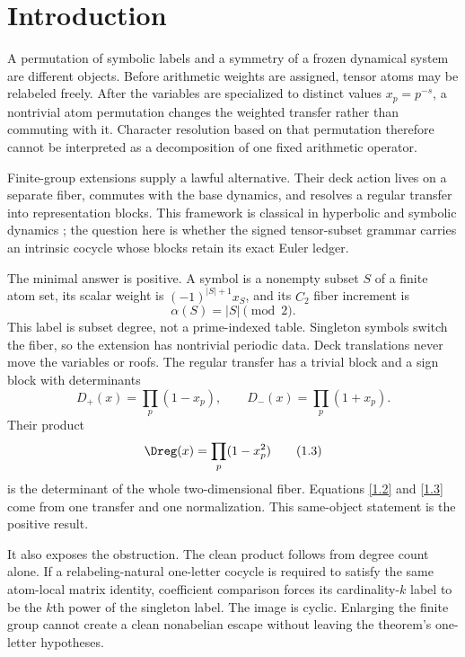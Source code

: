 \section{Introduction}
\label{sec:introduction}

A permutation of symbolic labels and a symmetry of a frozen dynamical system
are different objects.  Before arithmetic weights are assigned, tensor atoms
may be relabeled freely.  After the variables are specialized to distinct
values \(x_p=p^{-s}\), a nontrivial atom permutation changes the weighted
transfer rather than commuting with it.  Character resolution based on that
permutation therefore cannot be interpreted as a decomposition of one fixed
arithmetic operator.

Finite-group extensions supply a lawful alternative.  Their deck action lives
on a separate fiber, commutes with the base dynamics, and resolves a regular
transfer into representation blocks.  This framework is classical in
hyperbolic and symbolic dynamics
\citep{ParryPollicott1986,AdachiSunada1987,ParryPollicott1990}; the question
here is whether the signed tensor-subset grammar carries an intrinsic cocycle
whose blocks retain its exact Euler ledger.

The minimal answer is positive.  A symbol is a nonempty subset \(S\) of a
finite atom set, its scalar weight is
\((-1)^{|S|+1}x_S\), and its \(C_2\) fiber increment is
\[
\alpha(S)=|S|\pmod2.
\tag{1.1}\label{1.1}
\]
This label is subset degree, not a prime-indexed table.  Singleton symbols
switch the fiber, so the extension has nontrivial periodic data.  Deck
translations never move the variables or roofs.  The regular transfer has a
trivial block and a sign block with determinants
\[
D_+(x)=\prod_p(1-x_p),\qquad
D_-(x)=\prod_p(1+x_p).
\tag{1.2}\label{1.2}
\]
Their product
\[
\Dreg(x)=\prod_p(1-x_p^2)
\tag{1.3}\label{1.3}
\]
is the determinant of the whole two-dimensional fiber.  Equations
\eqref{1.2} and \eqref{1.3} come from one transfer and one normalization.
This same-object statement is the positive result.

It also exposes the obstruction.  The clean product follows from degree count
alone.  If a relabeling-natural one-letter cocycle is required to satisfy the
same atom-local matrix identity, coefficient comparison forces its
cardinality-\(k\) label to be the \(k\)th power of the singleton label.  The
image is cyclic.  Enlarging the finite group cannot create a clean nonabelian
escape without leaving the theorem's one-letter hypotheses.

